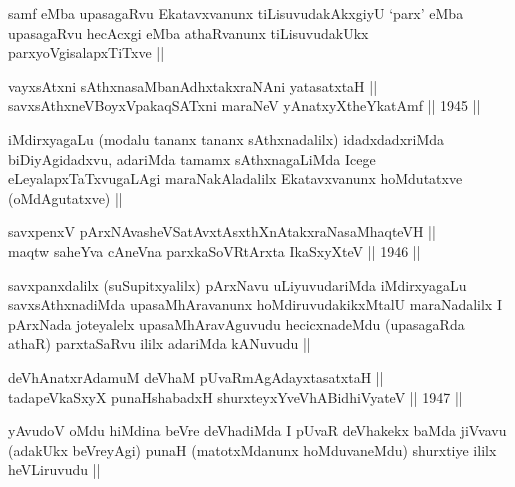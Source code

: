 \begin{artha}
samf eMba upasagaRvu Ekatavxvanunx tiLisuvudakAkxgiyU `parx' eMba
upasagaRvu hecAcxgi eMba athaRvanunx tiLisuvudakUkx
parxyoVgisalapxTiTxve ||
\end{artha}


\begin{shl}
vayxsAtxni sAthxnasaMbanAdhxtakxraNAni yatasatxtaH || \\
savxsAthxneVBoyxV\s pakaqSATxni maraNeV yAnatxyXtheYkatAmf ||  1945 ||  
\end{shl}

\begin{artha}
iMdirxyagaLu (modalu tananx tananx sAthxnadalilx) idadxdadxriMda
biDiyAgidadxvu, adariMda tamamx sAthxnagaLiMda Icege
eLeyalapxTaTxvugaLAgi maraNakAladalilx Ekatavxvanunx hoMdutatxve
(oMdAgutatxve) ||
\end{artha}


\begin{shl}
savxpenxV pArxNAvasheVSatAvxtAsxthXnAtakxraNasaMhaqteVH || \\
maqtw saheYva cAneVna parxkaSoVR\s tArxta IkaSxyXteV ||  1946 ||  
\end{shl}

\begin{artha}
savxpanxdalilx (suSupitxyalilx) pArxNavu uLiyuvudariMda iMdirxyagaLu
savxsAthxnadiMda upasaMhAravanunx hoMdiruvudakikxMtalU maraNadalilx I
pArxNada joteyalelx upasaMhAravAguvudu hecicxnadeMdu (upasagaRda
athaR) parxtaSaRvu ililx adariMda kANuvudu ||
\end{artha}


\begin{shl}
deVhAnatxrAdamuM deVhaM pUvaRmAgAdayxtasatxtaH || \\
tadapeVkaSxyX punaHshabadxH shurxteyxYveVhABidhiVyateV ||  1947 ||  
\end{shl}

\begin{artha}
yAvudoV oMdu hiMdina beVre deVhadiMda I pUvaR deVhakekx baMda jiVvavu
(adakUkx beVreyAgi) punaH (matotxMdanunx hoMduvaneMdu) shurxtiye ililx
heVLiruvudu ||
\end{artha}


